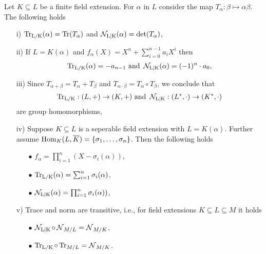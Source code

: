 
\begin{remin}
	Let $K\subseteq L$ be a finite field extension. For $\alpha$ in $L$ consider the map $T_\alpha: \beta\mapsto \alpha\beta$. The following holds
	\begin{itemize}
		\item [i)] $\operatorname{\operatorname{Tr}_{L/K}}(\alpha)=\operatorname{Tr}(T_\alpha)$ and $\operatorname{\mathcal{N}_{L \vert K}}(\alpha)=\det(T_\alpha)$,
		\item [ii)] If $L=K(\alpha)$ and $f_\alpha(X)=X^n+\sum_{i=0}^{n-1}a_i X^i$ then \begin{align*}
			\operatorname{\operatorname{Tr}_{L/K}}(\alpha)=-a_{n-1} \mathrm{~and~} \operatorname{\mathcal{N}_{L \vert K}}(\alpha)=(-1)^{n}\cdot a_0,
		\end{align*}
		\item [iii)] Since $T_{\alpha+\beta}=T_\alpha+T_\beta$ and $T_{\alpha\cdot\beta}=T_\alpha\circ T_\beta$, we conclude that 
		\begin{align*}
			\operatorname{\operatorname{Tr}_{L/K}}: (L,+)\to (K,+) \mathrm{~and~} \operatorname{\mathcal{N}_{L \vert K}}:(L^*,\cdot)\to (K^*,\cdot)
		\end{align*}
		are group homomorphisms,
		\item [iv)] Suppose $K\subseteq L$ is a seperable field extension with $L=K(\alpha)$. Further assume $\operatorname{Hom}_K(L,\overline{K})=\{\sigma_1,\dots,\sigma_n \}$. Then the following holds
		\begin{itemize}
			\item [$\bullet$] $f_\alpha= \prod_{i=1}^{n} (X-\sigma_i(\alpha))$,
			\item [$\bullet$] $\operatorname{\operatorname{Tr}_{L/K}}(\alpha)=\sum_{i=1}^{n} \sigma_i(\alpha)$,
			\item [$\bullet$] $\operatorname{\mathcal{N}_{L \vert K}}(\alpha)=\prod_{i=1}^{n}\sigma_i(\alpha))$,
		\end{itemize} 
		\item [v)] Trace and norm are transitive, i.e., for field extensions $K\subseteq L\subseteq M$ it holds
		\begin{itemize}
			\item [$\bullet$] $\operatorname{\mathcal{N}_{L \vert K}}\circ \operatorname{\mathcal{N}}_{M/L}=\operatorname{\mathcal{N}}_{M/K}$,
			\item [$\bullet$] $\operatorname{\operatorname{Tr}_{L/K}}\circ\operatorname{Tr}_{M/L}=\operatorname{\mathcal{N}}_{M/K}$.
		\end{itemize} 
	\end{itemize}
\end{remin}


